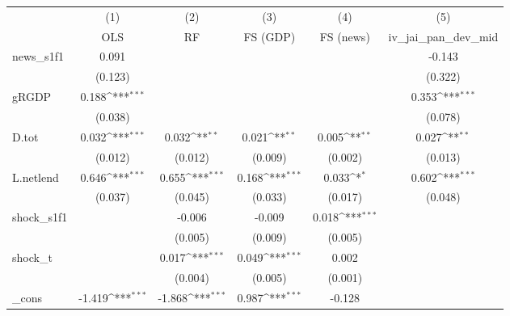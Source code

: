 {
\def\sym#1{\ifmmode^{#1}\else\(^{#1}\)\fi}
\begin{tabular}{l*{5}{c}}
\toprule
            &\multicolumn{1}{c}{(1)}&\multicolumn{1}{c}{(2)}&\multicolumn{1}{c}{(3)}&\multicolumn{1}{c}{(4)}&\multicolumn{1}{c}{(5)}\\
            &\multicolumn{1}{c}{OLS}&\multicolumn{1}{c}{RF}&\multicolumn{1}{c}{FS (GDP)}&\multicolumn{1}{c}{FS (news)}&\multicolumn{1}{c}{iv\_jai\_pan\_dev\_mid}\\
\midrule
news\_s1f1   &       0.091         &                     &                     &                     &      -0.143         \\
            &     (0.123)         &                     &                     &                     &     (0.322)         \\
\addlinespace
gRGDP       &       0.188\sym{***}&                     &                     &                     &       0.353\sym{***}\\
            &     (0.038)         &                     &                     &                     &     (0.078)         \\
\addlinespace
D.tot       &       0.032\sym{***}&       0.032\sym{**} &       0.021\sym{**} &       0.005\sym{**} &       0.027\sym{**} \\
            &     (0.012)         &     (0.012)         &     (0.009)         &     (0.002)         &     (0.013)         \\
\addlinespace
L.netlend   &       0.646\sym{***}&       0.655\sym{***}&       0.168\sym{***}&       0.033\sym{*}  &       0.602\sym{***}\\
            &     (0.037)         &     (0.045)         &     (0.033)         &     (0.017)         &     (0.048)         \\
\addlinespace
shock\_s1f1  &                     &      -0.006         &      -0.009         &       0.018\sym{***}&                     \\
            &                     &     (0.005)         &     (0.009)         &     (0.005)         &                     \\
\addlinespace
shock\_t     &                     &       0.017\sym{***}&       0.049\sym{***}&       0.002         &                     \\
            &                     &     (0.004)         &     (0.005)         &     (0.001)         &                     \\
\addlinespace
\_cons      &      -1.419\sym{***}&      -1.868\sym{***}&       0.987\sym{***}&      -0.128         &                     \\

\end{tabular}}
